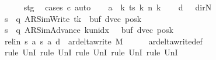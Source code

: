 \begin{isabellebody}
\ \ \ \ \isamarkupfalse%
\ stg\ \isamarkupfalse%
\ {\isacharparenleft}{\kern0pt}cases\ c{\isacharprime}{\kern0pt}{\isacharparenright}{\kern0pt}\ auto\isanewline
\ \ \isamarkupfalse%
\ {\isacharquery}{\kern0pt}a\ {\isacharequal}{\kern0pt}\ {\isachardoublequoteopen}{\isasymlambda}k{\isachardot}{\kern0pt}\ ts\ k\ {\isacharparenleft}{\kern0pt}n\ k{\isacharparenright}{\kern0pt}{\isachardoublequoteclose}\isanewline
\ \ \isamarkupfalse%
\ {\isacharquery}{\kern0pt}d\ {\isacharequal}{\kern0pt}\ {\isachardoublequoteopen}{\isasymlambda}{\isacharunderscore}{\kern0pt}{\isachardot}{\kern0pt}\ dir{\isachardot}{\kern0pt}N{\isachardoublequoteclose}\isanewline
\ \ \isamarkupfalse%
\ {\isacharquery}{\kern0pt}s\ {\isacharequal}{\kern0pt}\ {\isachardoublequoteopen}{\isacharparenleft}{\kern0pt}q{\isacharcomma}{\kern0pt}\ AR{\isacharunderscore}{\kern0pt}SimWrite{\isacharcomma}{\kern0pt}\ tk{\isacharcomma}{\kern0pt}\ {}{\isacharcomma}{\kern0pt}\ buf{\isacharcomma}{\kern0pt}\ dvec{\isacharcomma}{\kern0pt}\ posk{\isacharparenright}{\kern0pt}{\isachardoublequoteclose}\isanewline
\ \ \isamarkupfalse%
\ {\isacharquery}{\kern0pt}s{\isacharprime}{\kern0pt}\ {\isacharequal}{\kern0pt}\ {\isachardoublequoteopen}{\isacharparenleft}{\kern0pt}q{\isacharcomma}{\kern0pt}\ AR{\isacharunderscore}{\kern0pt}SimAdvance{\isacharcomma}{\kern0pt}\ k{\isacharunderscore}{\kern0pt}unidx\ {}{\isacharcomma}{\kern0pt}\ {}{\isacharcomma}{\kern0pt}\ buf{\isacharcomma}{\kern0pt}\ dvec{\isacharcomma}{\kern0pt}\ posk{\isacharparenright}{\kern0pt}{\isachardoublequoteclose}\isanewline
\ \ \isamarkupfalse%
\ rel{\isacharunderscore}{\kern0pt}in{\isacharcolon}{\kern0pt}\ {\isachardoublequoteopen}{\isacharparenleft}{\kern0pt}{\isacharquery}{\kern0pt}s{\isacharcomma}{\kern0pt}\ {\isacharquery}{\kern0pt}a{\isacharcomma}{\kern0pt}\ {\isacharquery}{\kern0pt}s{\isacharprime}{\kern0pt}{\isacharcomma}{\kern0pt}\ {\isacharquery}{\kern0pt}a{\isacharcomma}{\kern0pt}\ {\isacharquery}{\kern0pt}d{\isacharparenright}{\kern0pt}\ {\isasymin}\ ar{\isacharunderscore}{\kern0pt}delta{\isacharunderscore}{\kern0pt}write\ M{\isachardoublequoteclose}\isanewline
\ \ \ \ \isamarkupfalse%
\ ar{\isacharunderscore}{\kern0pt}delta{\isacharunderscore}{\kern0pt}write{\isacharunderscore}{\kern0pt}def\isanewline
\ \ \ \ \isamarkupfalse%
\ {\isacharparenleft}{\kern0pt}rule\ UnI{}{\isacharcomma}{\kern0pt}\ rule\ UnI{}{\isacharcomma}{\kern0pt}\ rule\ UnI{}{\isacharcomma}{\kern0pt}\ rule\ UnI{}{\isacharcomma}{\kern0pt}\ rule\ UnI{}{\isacharparenright}{\kern0pt}\isanewline

\end{isabellebody}
